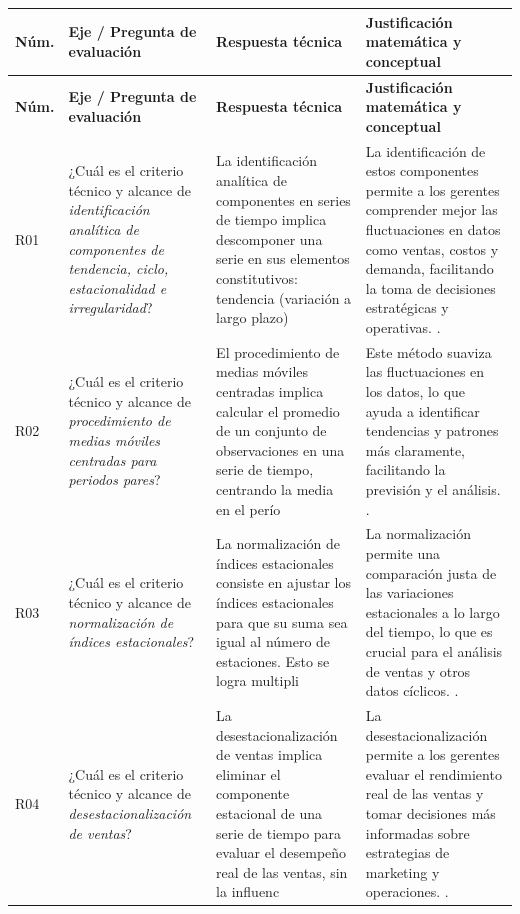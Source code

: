 {\begin{center}
\renewcommand{\arraystretch}{1.28}
\begin{longtable}{p{1.2cm}p{4.3cm}p{3.8cm}p{5.3cm}}
\hline
\textbf{Núm.} & \textbf{Eje / Pregunta de evaluación} & \textbf{Respuesta técnica} & \textbf{Justificación matemática y conceptual}\\\hline
\endfirsthead
\hline
\textbf{Núm.} & \textbf{Eje / Pregunta de evaluación} & \textbf{Respuesta técnica} & \textbf{Justificación matemática y conceptual}\\\hline
\endhead
R01 & ¿Cuál es el criterio técnico y alcance de \textit{identificación analítica de componentes de tendencia, ciclo, estacionalidad e irregularidad}? & La identificación analítica de componentes en series de tiempo implica descomponer una serie en sus elementos constitutivos: tendencia (variación a largo plazo) & La identificación de estos componentes permite a los gerentes comprender mejor las fluctuaciones en datos como ventas, costos y demanda, facilitando la toma de decisiones estratégicas y operativas. \citep{anderson2012,wackerly2010}.\\\hline
R02 & ¿Cuál es el criterio técnico y alcance de \textit{procedimiento de medias móviles centradas para periodos pares}? & El procedimiento de medias móviles centradas implica calcular el promedio de un conjunto de observaciones en una serie de tiempo, centrando la media en el perío & Este método suaviza las fluctuaciones en los datos, lo que ayuda a identificar tendencias y patrones más claramente, facilitando la previsión y el análisis. \citep{anderson2012,wackerly2010}.\\\hline
R03 & ¿Cuál es el criterio técnico y alcance de \textit{normalización de índices estacionales}? & La normalización de índices estacionales consiste en ajustar los índices estacionales para que su suma sea igual al número de estaciones. Esto se logra multipli & La normalización permite una comparación justa de las variaciones estacionales a lo largo del tiempo, lo que es crucial para el análisis de ventas y otros datos cíclicos. \citep{anderson2012,wackerly2010}.\\\hline
R04 & ¿Cuál es el criterio técnico y alcance de \textit{desestacionalización de ventas}? & La desestacionalización de ventas implica eliminar el componente estacional de una serie de tiempo para evaluar el desempeño real de las ventas, sin la influenc & La desestacionalización permite a los gerentes evaluar el rendimiento real de las ventas y tomar decisiones más informadas sobre estrategias de marketing y operaciones. \citep{anderson2012,wackerly2010}.\\\hline

\end{longtable}
\end{center}}

